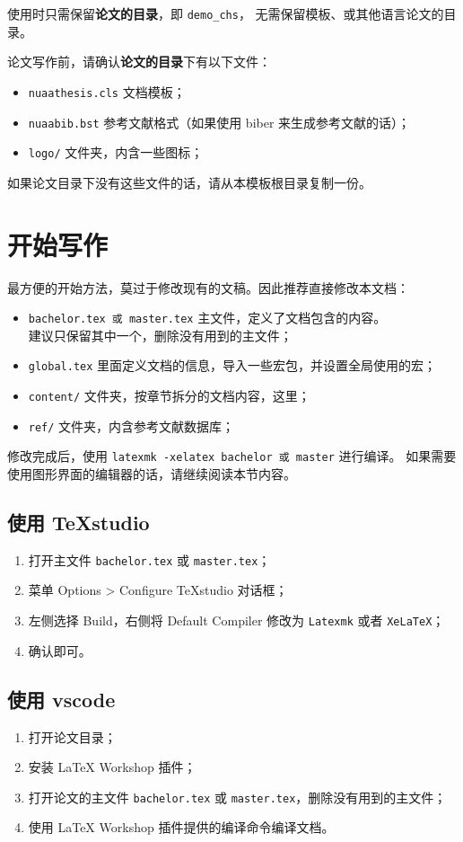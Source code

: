 使用时只需保留\textbf{论文的目录}，即 \texttt{demo\_chs}，
无需保留模板、或其他语言论文的目录。

论文写作前，请确认\textbf{论文的目录}下有以下文件：
\begin{itemize}
  \item \texttt{nuaathesis.cls} 文档模板；
  \item \texttt{nuaabib.bst} 参考文献格式（如果使用 biber 来生成参考文献的话）；
  \item \texttt{logo/} 文件夹，内含一些图标；
\end{itemize}

如果论文目录下没有这些文件的话，请从本模板根目录复制一份。

\section{开始写作}

最方便的开始方法，莫过于修改现有的文稿。因此推荐直接修改本文档：
\begin{itemize}
  \item \texttt{bachelor.tex 或 master.tex} 主文件，定义了文档包含的内容。\\
    建议只保留其中一个，删除没有用到的主文件；
  \item \texttt{global.tex} 里面定义文档的信息，导入一些宏包，并设置全局使用的宏；
  \item \texttt{content/} 文件夹，按章节拆分的文档内容，这里；
  \item \texttt{ref/} 文件夹，内含参考文献数据库；
\end{itemize}

修改完成后，使用 \texttt{latexmk -xelatex bachelor 或 master} 进行编译。
如果需要使用图形界面的编辑器的话，请继续阅读本节内容。

\subsection{使用 TeXstudio}
\begin{enumerate}
\item 打开主文件 \texttt{bachelor.tex} 或 \texttt{master.tex}；
\item 菜单 Options > Configure TeXstudio 对话框；
\item 左侧选择 Build，右侧将 Default Compiler 修改为 \texttt{Latexmk} 或者 \texttt{XeLaTeX}；
\item 确认即可。
\end{enumerate}

\subsection{使用 vscode}
\begin{enumerate}
\item 打开论文目录；
\item 安装 LaTeX Workshop 插件；
\item 打开论文的主文件 \texttt{bachelor.tex} 或 \texttt{master.tex}，删除没有用到的主文件；
\item 使用 LaTeX Workshop 插件提供的编译命令编译文档。
\end{enumerate}

